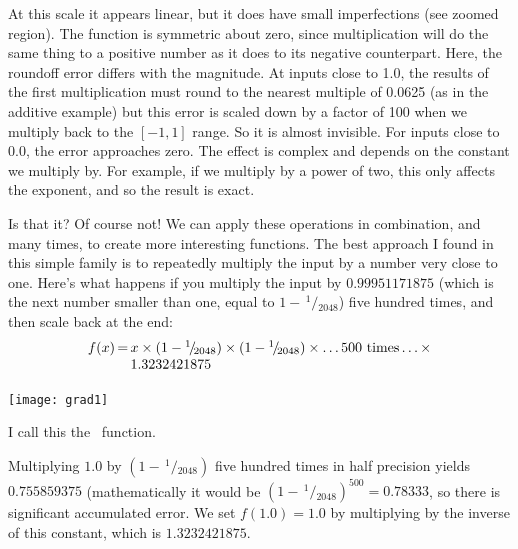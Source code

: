 \documentclass[twocolumn]{article}
\newcommand\sfrac[2]{\!{}\,^{#1}\!/{}\!_{#2}}
\begin{document}
At this scale it appears linear, but it does have small imperfections
(see zoomed region). The function is symmetric about zero, since
multiplication will do the same thing to a positive number as it does
to its negative counterpart. Here, the roundoff error differs with the
magnitude. At inputs close to 1.0, the results of the first
multiplication must round to the nearest multiple of 0.0625 (as in the
additive example) but this error is scaled down by a factor of 100
when we multiply back to the $[-1, 1]$ range. So it is almost invisible.
For inputs close to 0.0, the error approaches zero. The effect is complex
and depends on the constant we multiply by. For example, if we multiply
by a power of two, this only affects the exponent, and so the result is
exact.

\medskip
Is that it? Of course not! We can apply these operations in
combination, and many times, to create more interesting functions. The
best approach I found in this simple family is to repeatedly multiply
the input by a number very close to one. Here's what happens if you
multiply the input by $0.99951171875$ (which is the next number
smaller than one, equal to $1 - \sfrac{1}{2048}$) five hundred times,
and then scale back at the end:
%
\[
\begin{array}{r@{}c@{}l}
  f(x) & \,=\, & x \times (1 - \sfrac{1}{2048}) \times (1 - \sfrac{1}{2048}) \times \ldots \textrm{500 times} \ldots \times \\
  \, & \, & 1.3232421875$$
\end{array}
\]

\begin{center}
\texttt{[image: grad1]}
\end{center}

I call this the \gradone\ function.

Multiplying $1.0$ by $(1 - \sfrac{1}{2048})$ five hundred times in
half precision yields $0.755859375$ (mathematically it would be $(1 -
\sfrac{1}{2048})^{500} = 0.78333$, so there is significant accumulated
error. We set $f(1.0) = 1.0$ by multiplying by the inverse of this
constant, which is $1.3232421875$.
\end{document}

